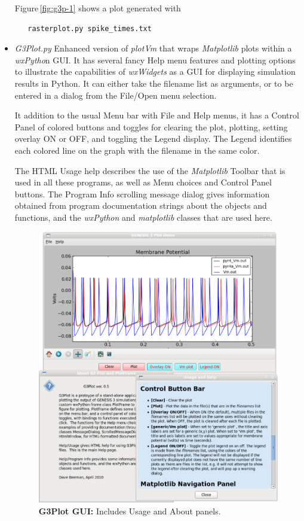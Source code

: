 \documentclass[12pt]{article}
\begin{document}
\begin{itemize}
Figure\,\ref{fig:g3p-1} shows a plot generated with
\begin{verbatim}
   rasterplot.py spike_times.txt
\end{verbatim}

\item{\it G3Plot.py} Enhanced version of {\it plotVm} that wraps {\it Matplotlib}
plots within a {\it wxPytho}n GUI.  It has several fancy Help menu features
and plotting options to illustrate the
capabilities of {\it wxWidgets} as a GUI for displaying simulation results in
Python.  It can either take the filename list as arguments, or to be
entered in a dialog from the File/Open menu selection.

It addition to the usual Menu bar with File and Help menus, it has a
Control Panel of colored buttons and toggles for clearing the plot,
plotting, setting overlay ON or OFF, and toggling the Legend display.
The Legend identifies each colored line on the graph with the filename in
the same color.

The HTML Usage help describes the use of the {\it Matplotlib} Toolbar that is
used in all these programs, as well as Menu choices and Control Panel
buttons.  The Program Info scrolling message dialog gives information
obtained from program documentation strings about the objects and
functions, and the {\it wxPython} and {\it matplotlib} classes that are used here.

\begin{figure}[h]
  \centering
   \includegraphics[scale=0.35]{figures/G3Plot-demo.eps}
\caption{{\bf G3Plot GUI:} Includes Usage and About panels.}
  \label{fig:g3p-2}
\end{figure}


\end{itemize}
\end{document}
